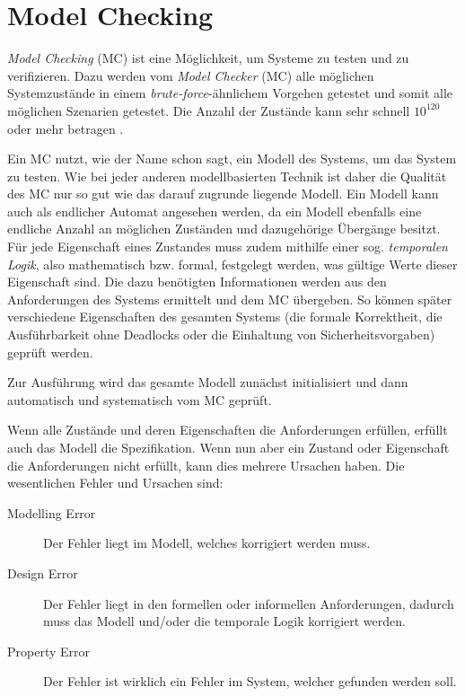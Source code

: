 \section{Model Checking}\label{sec:modelchecking}

\emph{Model Checking} (MC) ist eine Möglichkeit, um Systeme zu testen und zu verifizieren. Dazu werden vom \emph{Model Checker} (MC) alle möglichen Systemzustände in einem \emph{brute-force}-ähnlichem Vorgehen getestet und somit alle möglichen Szenarien getestet. Die Anzahl der Zustände kann sehr schnell $ 10^{120} $ oder mehr betragen \cite{Grumberg1999,Baier2008}.


Ein MC nutzt, wie der Name schon sagt, ein Modell des Systems, um das System zu testen. Wie bei jeder anderen modellbasierten Technik ist daher die Qualität des MC nur so gut wie das darauf zugrunde liegende Modell. Ein Modell kann auch als endlicher Automat angesehen werden, da ein Modell ebenfalls eine endliche Anzahl an möglichen Zuständen und dazugehörige Übergänge besitzt. Für jede Eigenschaft eines Zustandes muss zudem mithilfe einer sog. \emph{temporalen Logik}, also mathematisch bzw. formal, festgelegt werden, was gültige Werte dieser Eigenschaft sind. Die dazu benötigten Informationen werden aus den Anforderungen des Systems ermittelt und dem MC übergeben. So können später verschiedene Eigenschaften des gesamten Systems (\zB die formale Korrektheit, die Ausführbarkeit ohne Deadlocks oder die Einhaltung von Sicherheitsvorgaben) geprüft werden.

Zur Ausführung wird das gesamte Modell zunächst initialisiert und dann automatisch und systematisch vom MC geprüft.

Wenn alle Zustände und deren Eigenschaften die Anforderungen erfüllen, erfüllt auch das Modell die Spezifikation. Wenn nun aber ein Zustand oder Eigenschaft die Anforderungen nicht erfüllt, kann dies mehrere Ursachen haben. Die wesentlichen Fehler und Ursachen sind:

\begin{description}
	\item[Modelling Error] Der Fehler liegt im Modell, welches korrigiert werden muss.
	\item[Design Error] Der Fehler liegt in den formellen oder informellen Anforderungen, dadurch muss das Modell und/oder die temporale Logik korrigiert werden.
	\item[Property Error] Der Fehler ist wirklich ein Fehler im System, welcher gefunden werden soll.
\end{description}

